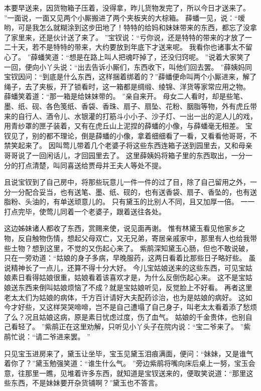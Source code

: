 本要早送来，因货物箱子压着，没得拿，昨儿货物发完了，所以今日才送来了。
”一面说，一面又见两个小厮搬进了两个夹板夹的大棕箱。
薛蟠一见，说：“嗳哟，可是我怎么就糊涂到这步田地了！特特的给妈和妹妹带来的东西，都忘了没拿了家里来，还是伙计送了来了。
”宝钗说：“亏你说，还是特特的带来的才放了一二十天，若不是特特的带来，大约要放到年底下才送来呢。
我看你也诸事太不留心了。
”薛蟠笑道：“想是在路上叫人把魂吓掉了，还没归窍呢。
”说着大家笑了一回，便向小丫头说：“出去告诉小厮们，东西收下，叫他们回去罢。
”薛姨妈同宝钗因问：“到底是什么东西，这样捆着绑着的？”薛蟠便命叫两个小厮进来，解了绳子，去了夹板，开了锁看时，这一箱都是绸缎、绫锦、洋货等家常应用之物。
薛蟠笑着道：“那一箱是给妹妹带的。
”亲自来开。
母女二人看时，却是些笔、墨、纸、砚、各色笺纸、香袋、香珠、扇子、扇坠、花粉、胭脂等物，外有虎丘带来的自行人、酒令儿、水银灌的打筋斗小小子、沙子灯、一出一出的泥人儿的戏，用青纱罩的匣子装着，又有在虎丘山上泥捏的薛蟠的小像，与薛蟠毫无相差。
宝钗见了，别的都不理论，倒是薛蟠的小像，拿着细细看了一看，又看看他哥哥，不禁笑起来了。
因叫莺儿带着几个老婆子将这些东西连箱子送到园里去，又和母亲哥哥说了一回闲话儿，才回园里去了。
这里薛姨妈将箱子里的东西取出，一分一分的打点清楚，叫同喜送给贾母并王夫人等处不提。
\par
且说宝钗到了自己房中，将那些玩意儿一件一件的过了目，除了自己留用之外，一分一分配合妥当，也有送笔、墨、纸、砚的，也有送香袋、扇子、香坠的，也有送脂粉、头油的，有单送顽意儿的。
只有黛玉的比别人不同，且又加厚一倍。
一一打点完毕，使莺儿同着一个老婆子，跟着送往各处。
\par
这边姊妹诸人都收了东西，赏赐来使，说见面再谢。
惟有林黛玉看见他家乡之物，反自触物伤情，想起父母双亡，又无兄弟，寄居亲戚家中，那里有人也给我带些土物？想到这里，不觉的又伤起心来了。
紫鹃深知黛玉心肠，但也不敢说破，只在一旁劝道：“姑娘的身子多病，早晚服药，这两日看着比那些日子略好些。
虽说精神长了一点儿，还算不得十分大好。
今儿宝姑娘送来的这些东西，可见宝姑娘素日看得姑娘很重，姑娘看着该喜欢才是，为什么反倒伤起心来。
这不是宝姑娘送东西来倒叫姑娘烦恼了不成？就是宝姑娘听见，反觉脸上不好看。
再者这里老太太们为姑娘的病体，千方百计请好大夫配药诊治，也为是姑娘的病好。
这如今才好些，又这样哭哭啼啼，岂不是自己遭塌了自己身子，叫老太太看着添了愁烦了么？况且姑娘这病，原是素日忧虑过度，伤了血气。
姑娘的千金贵体，也别自己看轻了。
”紫鹃正在这里劝解，只听见小丫头子在院内说：“宝二爷来了。
”紫鹃忙说：“请二爷进来罢。
”\par
只见宝玉进房来了，黛玉让坐毕，宝玉见黛玉泪痕满面，便问：“妹妹，又是谁气着你了？”黛玉勉强笑道：“谁生什么气。
”旁边紫鹃将嘴向床后桌上一努，宝玉会意，往那里一瞧，见堆着许多东西，就知道是宝钗送来的，便取笑说道：“那里这些东西，不是妹妹要开杂货铺啊？”黛玉也不答言。
